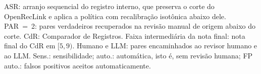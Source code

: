 \begin{table}[!ht]
{}
\par\footnotesize ASR: arranjo sequencial do registro interno, que preserva o corte do OpenRecLink e aplica a política com recalibração isotônica abaixo dele. PAR~=~2: pares verdadeiros recuperados na revisão manual de origem abaixo do corte. CdR: Comparador de Registros. Faixa intermediária da nota final: nota final do CdR em $[5,9)$. Humano e LLM: pares encaminhados ao revisor humano e ao LLM. Sens.: sensibilidade; auto.: automática, isto é, sem revisão humana; FP auto.: falsos positivos aceitos automaticamente.
\end{table}
